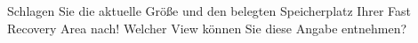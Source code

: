    \item Schlagen Sie die aktuelle Größe und den belegten Speicherplatz Ihrer Fast Recovery Area nach! Welcher View können Sie diese Angabe entnehmen?
